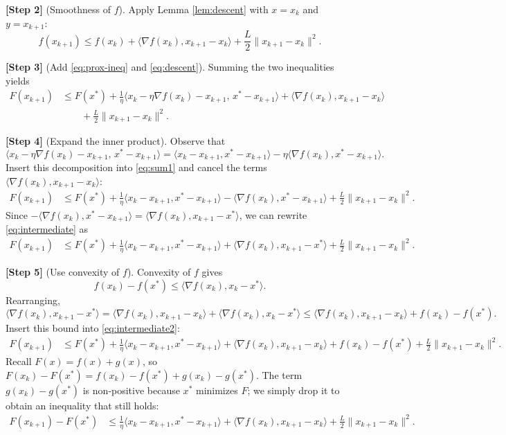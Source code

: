 \documentclass{article}
\begin{document}
\begin{enumerate}
\noindent\textbf{[Step 2]} (Smoothness of $f$).  
Apply Lemma \ref{lem:descent} with $x=x_{k}$ and $y=x_{k+1}$:
\begin{equation}
f(x_{k+1})\le f(x_{k})+\langle\nabla f(x_{k}),x_{k+1}-x_{k}\rangle+\frac{L}{2}\|x_{k+1}-x_{k}\|^{2}.
\label{eq:descent}
\end{equation}

\noindent\textbf{[Step 3]} (Add \eqref{eq:prox-ineq} and \eqref{eq:descent}).  
Summing the two inequalities yields
\begin{align}
F(x_{k+1}) &\le F(x^{*})
   +\frac{1}{\eta}\big\langle x_{k}-\eta\nabla f(x_{k})-x_{k+1},\,x^{*}-x_{k+1}\big\rangle
   +\langle\nabla f(x_{k}),x_{k+1}-x_{k}\rangle \nonumber\\
   &\qquad +\frac{L}{2}\|x_{k+1}-x_{k}\|^{2}.
\label{eq:sum1}
\end{align}

\noindent\textbf{[Step 4]} (Expand the inner product).  
Observe that
\[
\big\langle x_{k}-\eta\nabla f(x_{k})-x_{k+1},\,x^{*}-x_{k+1}\big\rangle
= \langle x_{k}-x_{k+1},x^{*}-x_{k+1}\rangle
   -\eta\langle\nabla f(x_{k}),x^{*}-x_{k+1}\rangle .
\]
Insert this decomposition into \eqref{eq:sum1} and cancel the terms 
$\langle\nabla f(x_{k}),x_{k+1}-x_{k}\rangle$:
\begin{align}
F(x_{k+1}) &\le F(x^{*})
   +\frac{1}{\eta}\langle x_{k}-x_{k+1},x^{*}-x_{k+1}\rangle
   -\langle\nabla f(x_{k}),x^{*}-x_{k+1}\rangle
   +\frac{L}{2}\|x_{k+1}-x_{k}\|^{2}.
\label{eq:intermediate}
\end{align}
Since $-\langle\nabla f(x_{k}),x^{*}-x_{k+1}\rangle
= \langle\nabla f(x_{k}),x_{k+1}-x^{*}\rangle$, we can rewrite \eqref{eq:intermediate} as
\begin{align}
F(x_{k+1}) &\le F(x^{*})
   +\frac{1}{\eta}\langle x_{k}-x_{k+1},x^{*}-x_{k+1}\rangle
   +\langle\nabla f(x_{k}),x_{k+1}-x^{*}\rangle
   +\frac{L}{2}\|x_{k+1}-x_{k}\|^{2}.
\label{eq:intermediate2}
\end{align}

\noindent\textbf{[Step 5]} (Use convexity of $f$).  
Convexity of $f$ gives
\[
f(x_{k})-f(x^{*})\le\langle\nabla f(x_{k}),x_{k}-x^{*}\rangle.
\]
Rearranging,
\[
\langle\nabla f(x_{k}),x_{k+1}-x^{*}\rangle
 =\langle\nabla f(x_{k}),x_{k+1}-x_{k}\rangle
   +\langle\nabla f(x_{k}),x_{k}-x^{*}\rangle
 \le\langle\nabla f(x_{k}),x_{k+1}-x_{k}\rangle+f(x_{k})-f(x^{*}).
\]
Insert this bound into \eqref{eq:intermediate2}:
\begin{align}
F(x_{k+1}) &\le F(x^{*})
   +\frac{1}{\eta}\langle x_{k}-x_{k+1},x^{*}-x_{k+1}\rangle
   +\langle\nabla f(x_{k}),x_{k+1}-x_{k}\rangle
   +f(x_{k})-f(x^{*})
   +\frac{L}{2}\|x_{k+1}-x_{k}\|^{2}.
\end{align}
Recall $F(x)=f(x)+g(x)$, so $F(x_{k})-F(x^{*})=f(x_{k})-f(x^{*})+g(x_{k})-g(x^{*})$. The term $g(x_{k})-g(x^{*})$ is non‑positive because $x^{*}$ minimizes $F$; we simply drop it to obtain an inequality that still holds:
\begin{align}
F(x_{k+1})-F(x^{*}) &\le
   \frac{1}{\eta}\langle x_{k}-x_{k+1},x^{*}-x_{k+1}\rangle
   +\langle\nabla f(x_{k}),x_{k+1}-x_{k}\rangle
   +\frac{L}{2}\|x_{k+1}-x_{k}\|^{2}.
\label{eq:pre-telescope}
\end{align}


\end{enumerate}
\end{document}

